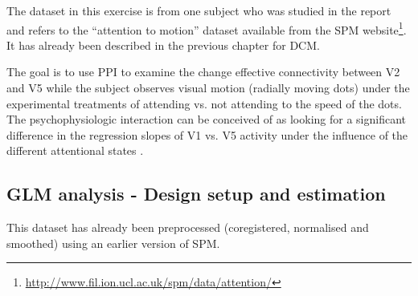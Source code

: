 The dataset in this exercise is from one subject who was studied in the \cite{buchel1998} report and refers to the ``attention to motion'' dataset available from the SPM website\footnote{\url{http://www.fil.ion.ucl.ac.uk/spm/data/attention/}}. It has already been described in the previous chapter for DCM.

The goal is to use PPI to examine the change effective connectivity between V2 and V5 while the subject observes visual motion (radially moving dots) under the experimental treatments of attending vs. not attending to the speed of the dots. The psychophysiologic interaction can be conceived of as looking for a significant difference in the regression slopes of V1 vs. V5 activity under the influence of the different attentional states \cite{ppi}.

\subsection{GLM analysis - Design setup and estimation}

This dataset has already been preprocessed (coregistered, normalised and smoothed) using an earlier version of SPM.


